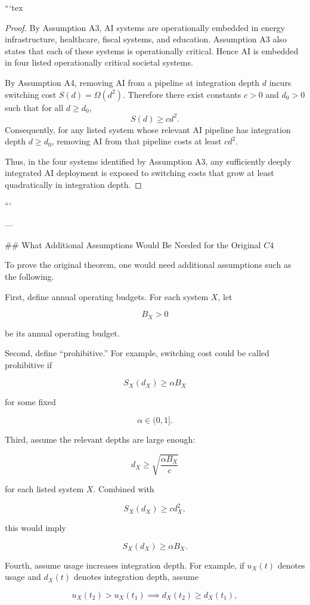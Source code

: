 ```tex
\begin{proof}
By Assumption A3, AI systems are operationally embedded in energy
infrastructure, healthcare, fiscal systems, and education. Assumption A3 also
states that each of these systems is operationally critical. Hence AI is
embedded in four listed operationally critical societal systems.

By Assumption A4, removing AI from a pipeline at integration depth $d$ incurs
switching cost $S(d)=\Omega(d^2)$. Therefore there exist constants $c>0$ and
$d_0>0$ such that for all $d \ge d_0$,
\[
S(d) \ge c d^2.
\]
Consequently, for any listed system whose relevant AI pipeline has integration
depth $d \ge d_0$, removing AI from that pipeline costs at least $c d^2$.

Thus, in the four systems identified by Assumption A3, any sufficiently deeply
integrated AI deployment is exposed to switching costs that grow at least
quadratically in integration depth.
\end{proof}
```

---

## What Additional Assumptions Would Be Needed for the Original \(C4\)

To prove the original theorem, one would need additional assumptions such as the following.

First, define annual operating budgets. For each system \(X\), let

\[
B_X>0
\]

be its annual operating budget.

Second, define “prohibitive.” For example, switching cost could be called prohibitive if

\[
S_X(d_X) \ge \alpha B_X
\]

for some fixed

\[
\alpha \in (0,1].
\]

Third, assume the relevant depths are large enough:

\[
d_X \ge \sqrt{\frac{\alpha B_X}{c}}
\]

for each listed system \(X\). Combined with

\[
S_X(d_X) \ge c d_X^2,
\]

this would imply

\[
S_X(d_X) \ge \alpha B_X.
\]

Fourth, assume usage increases integration depth. For example, if \(u_X(t)\) denotes usage and \(d_X(t)\) denotes integration depth, assume

\[
u_X(t_2)>u_X(t_1)
\implies
d_X(t_2)\ge d_X(t_1),
\]

